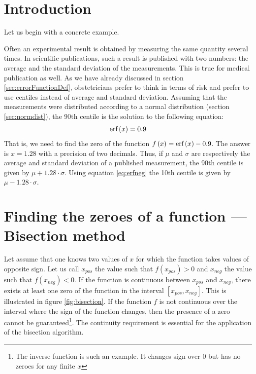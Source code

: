 \section{Introduction}
Let us begin with a concrete example.

Often an experimental result is obtained by measuring the same
quantity several times. In scientific publications, such a result
is published with two numbers: the average and the standard
deviation of the measurements. This is true for medical
publication as well. As we have already discussed in section
\ref{sec:errorFunctionDef}, obstetricians prefer to think in terms
of risk and prefer to use centiles instead of average and standard
deviation. Assuming that the measurements were distributed
according to a normal distribution (\cf section
\ref{sec:normdist}), the 90th centile is the solution to the
following equation:
\begin{equation}
\label{eq:centile90}
  \mathop{\textrm{erf}}\left(x\right)=0.9
\end{equation}
That is, we need to find the zero of the function
$f\left(x\right)=\mathop{\textrm{erf}}\left(x\right)-0.9$. The answer is $x=1.28$
with a precision of two decimals. Thus, if $\mu$ and $\sigma$ are
respectively the average and standard deviation of a published
measurement, the 90th centile is given by $\mu+1.28\cdot\sigma$.
Using equation \ref{eq:erfneg} the 10th centile is given by
$\mu-1.28\cdot\sigma$.

\section{Finding the zeroes of a function --- Bisection method}
\label{sec:bisection}
Let assume that one knows two values of $x$ for which the function takes values of
opposite sign. Let us call $x_{pos}$ the value such
that $f\left(x_{pos}\right)>0$ and $x_{neg}$ the value such that $f\left(x_{neg}\right)<0$.
If the function is continuous between $x_{pos}$ and
$x_{neg}$, there exists at least one zero of the
function in the interval $\left[ x_{pos},x_{neg}\right]$. This is illustrated in figure
\ref{fig:bisection}. If the function $f$ is not continuous over
the interval where the sign of the function changes, then the
presence of a zero cannot be guaranteed\footnote{The inverse
function is such an example. It changes sign over 0 but has no
zeroes for any finite $x$}. The continuity requirement is
essential for the application of the bisection algorithm.


